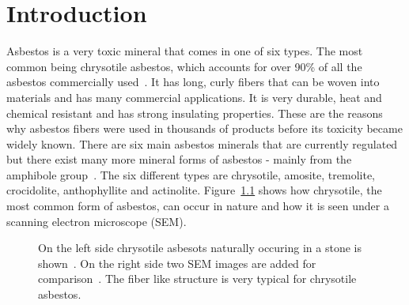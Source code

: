 \chapter{Introduction}

Asbestos is a very toxic mineral that comes in one of six types. The most common being chrysotile asbestos, which accounts for over 90\% of all the asbestos commercially used~\cite{asbestosMaacenter}. It has long, curly fibers that can be woven into materials and has many commercial applications. It is very durable, heat and chemical resistant and has strong insulating properties. These are the reasons why asbestos fibers were used in thousands of products before its toxicity became widely known. There are six main asbestos minerals that are currently regulated but there exist many more mineral forms of asbestos - mainly from the amphibole group~\cite{environmental2008framework}. The six different types are chrysotile, amosite, tremolite, crocidolite, anthophyllite and actinolite. Figure~\ref{fig:chrysotile} shows how chrysotile, the most common form of asbestos, can occur in nature and how it is seen under a scanning electron microscope (SEM). \\

\begin{figure}[h]
\centering
\caption{On the left side chrysotile asbesots naturally occuring in a stone is shown~\cite{chrysoltileFullSizeImage}. On the right side two SEM images are added for comparison~\cite{mohammed2015}. The fiber like structure is very typical for chrysotile asbestos.}
\label{fig:chrysotile}
\end{figure}

\quad

